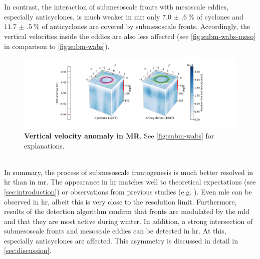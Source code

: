 \\
\\
In contrast, the interaction of submesoscale fronts with mesoscale eddies, especially anticyclones, is much weaker in \ac{mr}: only $\SI[separate-uncertainty]{7.0(6)}{\percent}$ of cyclones and $\SI[separate-uncertainty]{11.7(5)}{\percent}$ of anticyclones are covered by submesoscale fronts. Accordingly, the vertical velocities inside the eddies are also less affected (see \autoref{fig:subm-wabs-meso} in comparison to \autoref{fig:subm-wabs}).\\
\begin{figure}
    \centering
    \hspace*{0.3cm}\includegraphics[width=17cm, trim=5cm 0 0 0]{../figures/result_composites_w-abs-p30}
    \caption[Vertical velocity anomaly in MR]{\textbf{Vertical velocity anomaly in MR}. See \autoref{fig:subm-wabs} for explanations.}\label{fig:subm-wabs-meso}
\end{figure}
\\
In summary, the process of submesoscale frontogenesis is much better resolved in \ac{hr} than in \ac{mr}. The appearance in \ac{hr} matches well to theoretical expectations (see \autoref{sec:introduction}) or observations from previous studies (e.g. \textcite{capet-2008-fronts2}). Even \ac{mle} can be observed in \ac{hr}, albeit this is very close to the resolution limit. Furthermore, results of the detection algorithm confirm that fronts are modulated by the \ac{mld} and that they are most active during winter. In addition, a strong intersection of submesoscale fronts and mesoscale eddies can be detected in \ac{hr}. At this, especially anticyclones are affected. This asymmetry is discussed in detail in \autoref{sec:discussion}.